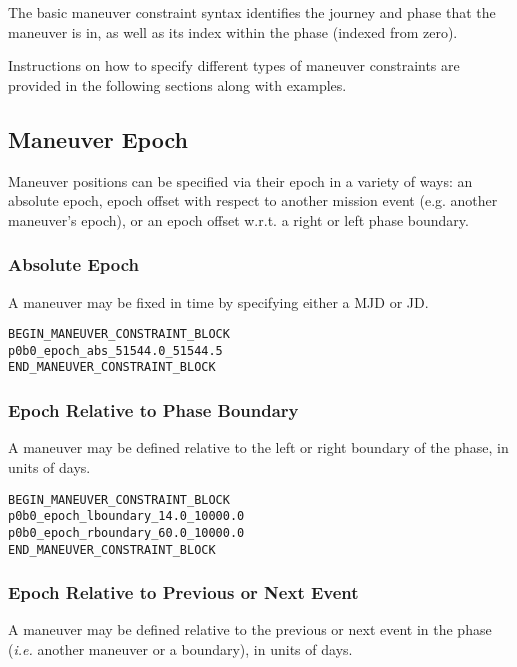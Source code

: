 \documentclass[11pt]{article}
\begin{document}
\noindent The basic maneuver constraint syntax identifies the journey and phase that the maneuver is in, as well as its index within the phase (indexed from zero).

\noindent Instructions on how to specify different types of maneuver constraints are provided in the following sections along with examples.

\subsection{Maneuver Epoch}
\label{subsec:MGAnDSMs_constraintEpoch}

Maneuver positions can be specified via their epoch in a variety of ways: an absolute epoch, epoch offset with respect to another mission event (e.g. another maneuver's epoch), or an epoch offset w.r.t. a right or left phase boundary.

\subsubsection{Absolute Epoch}

A maneuver may be fixed in time by specifying either a \ac{MJD} or \ac{JD}.

\begin{verbatim}
BEGIN_MANEUVER_CONSTRAINT_BLOCK
p0b0_epoch_abs_51544.0_51544.5
END_MANEUVER_CONSTRAINT_BLOCK
\end{verbatim}

\subsubsection{Epoch Relative to Phase Boundary}

A maneuver may be defined relative to the left or right boundary of the phase, in units of days.

\begin{verbatim}
BEGIN_MANEUVER_CONSTRAINT_BLOCK
p0b0_epoch_lboundary_14.0_10000.0
p0b0_epoch_rboundary_60.0_10000.0
END_MANEUVER_CONSTRAINT_BLOCK
\end{verbatim}

\subsubsection{Epoch Relative to Previous or Next Event}

A maneuver may be defined relative to the previous or next event in the phase (\textit{i.e.} another maneuver or a boundary), in units of days.
\end{document}
